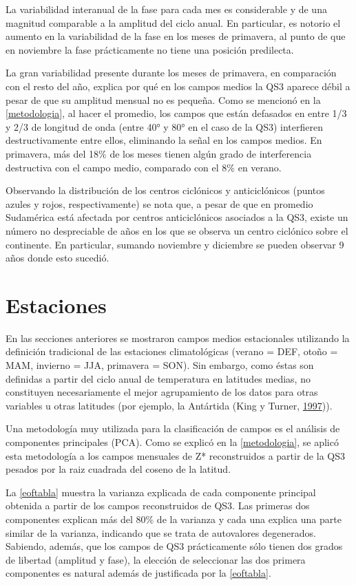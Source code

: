\documentclass[spanish,a4paper,12pt,oneside]{book}
\begin{document}
La variabilidad interanual de la fase para cada mes es considerable y de
una magnitud comparable a la amplitud del ciclo anual. En particular, es
notorio el aumento en la variabilidad de la fase en los meses de
primavera, al punto de que en noviembre la fase prácticamente no tiene
una posición predilecta.

La gran variabilidad presente durante los meses de primavera, en
comparación con el resto del año, explica por qué en los campos medios
la QS3 aparece débil a pesar de que su amplitud mensual no es pequeña.
Como se mencionó en la \autoref{metodologia}, al hacer el promedio, los
campos que están defasados en entre 1/3 y 2/3 de longitud de onda (entre
40° y 80° en el caso de la QS3) interfieren destructivamente entre
ellos, eliminando la señal en los campos medios. En primavera, más del
18\% de los meses tienen algún grado de interferencia destructiva con el
campo medio, comparado con el 8\% en verano.

Observando la distribución de los centros ciclónicos y anticiclónicos
(puntos azules y rojos, respectivamente) se nota que, a pesar de que en
promedio Sudamérica está afectada por centros anticiclónicos asociados a
la QS3, existe un número no despreciable de años en los que se observa
un centro ciclónico sobre el continente. En particular, sumando
noviembre y diciembre se pueden observar 9 años donde esto sucedió.

\section{Estaciones}\label{estaciones}

En las secciones anteriores se mostraron campos medios estacionales
utilizando la definición tradicional de las estaciones climatológicas
(verano = DEF, otoño = MAM, invierno = JJA, primavera = SON). Sin
embargo, como éstas son definidas a partir del ciclo anual de
temperatura en latitudes medias, no constituyen necesariamente el mejor
agrupamiento de los datos para otras variables u otras latitudes (por
ejemplo, la Antártida (King y Turner,
\protect\hyperlink{ref-King1997}{1997})).

Una metodología muy utilizada para la clasificación de campos es el
análisis de componentes principales (PCA). Como se explicó en la
\autoref{metodologia}, se aplicó esta metodología a los campos mensuales
de Z* reconstruidos a partir de la QS3 pesados por la raiz cuadrada del
coseno de la latitud.

La \autoref{eoftabla} muestra la varianza explicada de cada componente
principal obtenida a partir de los campos reconstruidos de QS3. Las
primeras dos componentes explican más del 80\% de la varianza y cada una
explica una parte similar de la varianza, indicando que se trata de
autovalores degenerados. Sabiendo, además, que los campos de QS3
prácticamente sólo tienen dos grados de libertad (amplitud y fase), la
elección de seleccionar las dos primera componentes es natural además de
justificada por la \autoref{eoftabla}.
\end{document}
